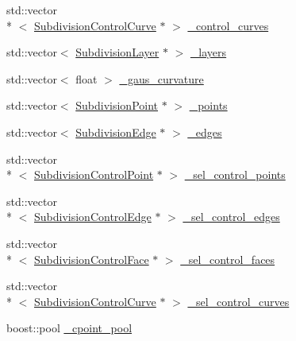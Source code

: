 \begin{DoxyCompactItemize}
std\-::vector\\*
$<$ \hyperlink{classShipCADGeometry_1_1SubdivisionControlCurve}{Subdivision\-Control\-Curve} $\ast$ $>$ \hyperlink{classShipCADGeometry_1_1SubdivisionSurface_ae55f8fae758bd76dd3aaed737c61434c}{\-\_\-control\-\_\-curves}
\item 
std\-::vector$<$ \hyperlink{classShipCADGeometry_1_1SubdivisionLayer}{Subdivision\-Layer} $\ast$ $>$ \hyperlink{classShipCADGeometry_1_1SubdivisionSurface_adabe1dd268e280a6d21e3c546639175a}{\-\_\-layers}
\item 
std\-::vector$<$ float $>$ \hyperlink{classShipCADGeometry_1_1SubdivisionSurface_aa7f39e4d68d2b36a0a8ce3d6e386bce7}{\-\_\-gaus\-\_\-curvature}
\item 
std\-::vector$<$ \hyperlink{classShipCADGeometry_1_1SubdivisionPoint}{Subdivision\-Point} $\ast$ $>$ \hyperlink{classShipCADGeometry_1_1SubdivisionSurface_aee8defd15695208cd384c7e384b3525e}{\-\_\-points}
\item 
std\-::vector$<$ \hyperlink{classShipCADGeometry_1_1SubdivisionEdge}{Subdivision\-Edge} $\ast$ $>$ \hyperlink{classShipCADGeometry_1_1SubdivisionSurface_aeb49c9cecfb5bbf15e0983133e490cdf}{\-\_\-edges}
\item 
std\-::vector\\*
$<$ \hyperlink{classShipCADGeometry_1_1SubdivisionControlPoint}{Subdivision\-Control\-Point} $\ast$ $>$ \hyperlink{classShipCADGeometry_1_1SubdivisionSurface_a0a79167ca5f6a2604752a803dcc065da}{\-\_\-sel\-\_\-control\-\_\-points}
\item 
std\-::vector\\*
$<$ \hyperlink{classShipCADGeometry_1_1SubdivisionControlEdge}{Subdivision\-Control\-Edge} $\ast$ $>$ \hyperlink{classShipCADGeometry_1_1SubdivisionSurface_a0a93da68dbd5f8f29a2834a9410353d1}{\-\_\-sel\-\_\-control\-\_\-edges}
\item 
std\-::vector\\*
$<$ \hyperlink{classShipCADGeometry_1_1SubdivisionControlFace}{Subdivision\-Control\-Face} $\ast$ $>$ \hyperlink{classShipCADGeometry_1_1SubdivisionSurface_ad923194e92a6a88cbc9608c13a70436f}{\-\_\-sel\-\_\-control\-\_\-faces}
\item 
std\-::vector\\*
$<$ \hyperlink{classShipCADGeometry_1_1SubdivisionControlCurve}{Subdivision\-Control\-Curve} $\ast$ $>$ \hyperlink{classShipCADGeometry_1_1SubdivisionSurface_ad707edb71feec99421107e9664e393be}{\-\_\-sel\-\_\-control\-\_\-curves}
\item 
boost\-::pool \hyperlink{classShipCADGeometry_1_1SubdivisionSurface_aa9d50a7eea24cebe4e97f5af8dc0c4d8}{\-\_\-cpoint\-\_\-pool}

\end{DoxyCompactItemize}
